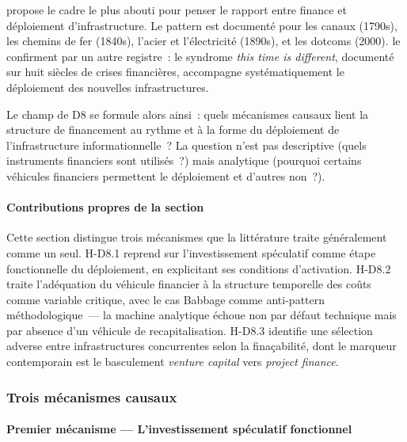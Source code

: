 \markEVO \textcite{perez_technological_2002} propose le cadre le plus abouti pour penser le rapport entre finance et déploiement d'infrastructure.  Le pattern est documenté pour les canaux (1790s), les chemins de fer (1840s), l'acier et l'électricité (1890s), et les dotcoms (2000). \textcite{reinhart_this_2009} le confirment par un autre registre~: le syndrome \og \emph{this time is different}\fg{}, documenté sur huit siècles de crises financières, accompagne systématiquement le déploiement des nouvelles infrastructures.

Le champ de D8 se formule alors ainsi~: quels mécanismes causaux lient la structure de financement au rythme et à la forme du déploiement de l'infrastructure informationnelle~? La question n'est pas descriptive (quels instruments financiers sont utilisés~?) mais analytique (pourquoi certains véhicules financiers permettent le déploiement et d'autres non~?).

\paragraph{Contributions propres de la section}
Cette section distingue trois mécanismes que la littérature traite généralement comme un seul. H-D8.1 reprend \textcite{perez_technological_2002} sur l'investissement spéculatif comme étape fonctionnelle du déploiement, en explicitant ses conditions d'activation. H-D8.2 traite l'adéquation du véhicule financier à la structure temporelle des coûts comme variable critique, avec le cas Babbage comme anti-pattern méthodologique~--- la machine analytique échoue non par défaut technique mais par absence d'un véhicule de recapitalisation. H-D8.3 identifie une sélection adverse entre infrastructures concurrentes selon la finaçabilité, dont le marqueur contemporain est le basculement \emph{venture capital} vers \emph{project finance}.


\subsubsection{Trois mécanismes causaux}

\paragraph{Premier mécanisme --- L'investissement spéculatif fonctionnel}

